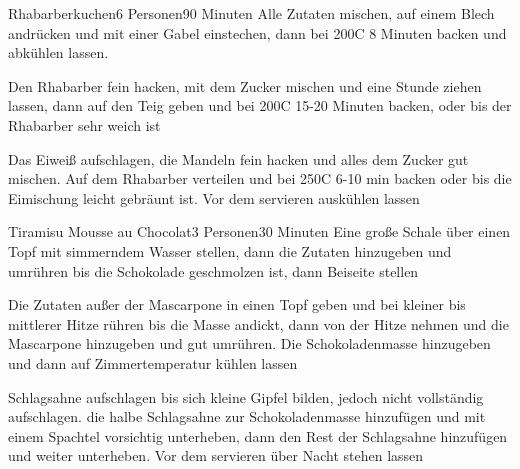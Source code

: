 \documentclass{book}
\begin{document}

\begin{recipe}{Rhabarberkuchen}{6 Personen}{90 Minuten}
Alle Zutaten mischen, auf einem Blech andrücken und mit einer Gabel einstechen, dann bei 200\0C 8 Minuten backen und abkühlen lassen.

Den Rhabarber fein hacken, mit dem Zucker mischen und eine Stunde ziehen lassen, dann auf den Teig geben und bei 200\0C 15-20 Minuten backen, oder bis der Rhabarber sehr weich ist

Das Eiweiß aufschlagen, die Mandeln fein hacken und alles dem Zucker gut mischen.
Auf dem Rhabarber verteilen und bei 250\0C 6-10 min backen oder bis die Eimischung leicht gebräunt ist.
Vor dem servieren auskühlen lassen
\end{recipe}


\begin{recipe}{Tiramisu Mousse au Chocolat}{3 Personen}{30 Minuten}
Eine große Schale über einen Topf mit simmerndem Wasser stellen, dann die Zutaten hinzugeben und umrühren bis die Schokolade geschmolzen ist, dann Beiseite stellen

Die Zutaten außer der Mascarpone in einen Topf geben und bei kleiner bis mittlerer Hitze rühren bis die Masse andickt, dann von der Hitze nehmen und die Mascarpone hinzugeben und gut umrühren.
Die Schokoladenmasse hinzugeben und dann auf Zimmertemperatur kühlen lassen

Schlagsahne aufschlagen bis sich kleine Gipfel bilden, jedoch nicht vollständig aufschlagen.
die halbe Schlagsahne zur Schokoladenmasse hinzufügen und mit einem Spachtel vorsichtig unterheben, dann den Rest der Schlagsahne hinzufügen und weiter unterheben.
Vor dem servieren über Nacht stehen lassen
\end{recipe}

\end{document}

